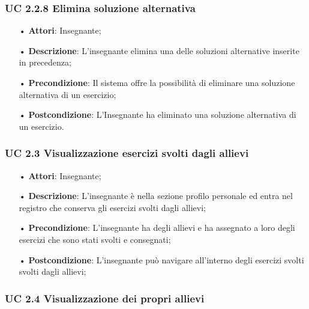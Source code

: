 \subsubsection{UC 2.2.8 Elimina soluzione alternativa}
\begin{itemize}
	\item[•] \textbf{Attori}: Insegnante;
	\item[•] \textbf{Descrizione}: L'insegnante elimina una delle soluzioni alternative inserite in precedenza;
	\item[•] \textbf{Precondizione}: Il sistema offre la possibilità di eliminare una soluzione alternativa di un esercizio;
	\item[•] \textbf{Postcondizione}: L'Insegnante ha eliminato una soluzione alternativa di un esercizio.
\end{itemize}

\subsubsection{UC 2.3 Visualizzazione esercizi svolti dagli allievi}
\begin{itemize}
	\item[•] \textbf{Attori}: Insegnante;
	\item[•] \textbf{Descrizione}:  L’insegnante è nella sezione profilo personale ed entra
		nel registro che conserva gli esercizi svolti dagli allievi;
	\item[•] \textbf{Precondizione}:  L’insegnante ha degli allievi e ha assegnato a loro degli esercizi che sono stati svolti e consegnati;

	\item[•] \textbf{Postcondizione}: L’insegnante può navigare all’interno degli esercizi svolti svolti dagli allievi; 	
\end{itemize}

\subsubsection{UC 2.4 Visualizzazione dei propri allievi}


